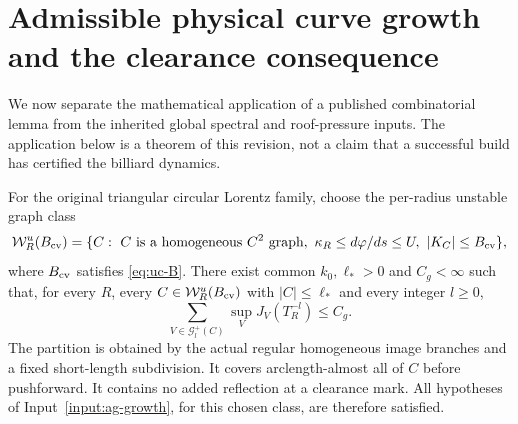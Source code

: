 \section{Admissible physical curve growth and the clearance consequence}
\label{sec:uc-growth}
We now separate the mathematical application of a published combinatorial
lemma from the inherited global spectral and roof-pressure inputs. The
application below is a theorem of this revision, not a claim that a
successful build has certified the billiard dynamics.

\begin{theorem}
\label{thm:uc-growth}
For the original triangular circular Lorentz family, choose the per-radius
unstable graph class
\[
 \mathcal W_R^u(B_{\rm cv})=\{C:\ C\text{ is a homogeneous }C^2\text{ graph},\
           \kappa_R\le d\varphi/ds\le U,\ |K_C|\le B_{\rm cv}\},
\]
where $B_{\rm cv}$ satisfies \eqref{eq:uc-B}. There exist common $k_0,\ell_*>0$
and $C_g<\infty$ such that, for every $R$, every
$C\in\mathcal W_R^u(B_{\rm cv})$ with $|C|\le\ell_*$ and every integer $l\ge0$,
\begin{equation}\label{eq:uc-growth-conclusion}
 \sum_{V\in\mathcal G_l^+(C)}\sup_V J_V(T_R^{-l})\le C_g.
\end{equation}
The partition is obtained by the actual regular homogeneous image branches
and a fixed short-length subdivision. It covers arclength-almost all of
$C$ before pushforward. It contains no added reflection at a clearance mark.
All hypotheses of Input~\ref{input:ag-growth}, for this chosen class, are
therefore satisfied.
\end{theorem}
